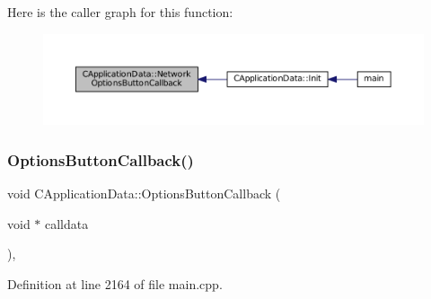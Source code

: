 Here is the caller graph for this function\+:
\nopagebreak
\begin{figure}[H]
\begin{center}
\leavevmode
\includegraphics[width=350pt]{classCApplicationData_ad41dbc2f54ee638aa64a1d0c22b3fba9_icgraph}
\end{center}
\end{figure}
\hypertarget{classCApplicationData_a3647cf78eb59689b901d4204c81555b4}{}\label{classCApplicationData_a3647cf78eb59689b901d4204c81555b4} 
\subsubsection{\texorpdfstring{Options\+Button\+Callback()}{OptionsButtonCallback()}}
{\footnotesize\ttfamily void C\+Application\+Data\+::\+Options\+Button\+Callback (\begin{DoxyParamCaption}\item[{void $\ast$}]{calldata }\end{DoxyParamCaption})\hspace{0.3cm}{\ttfamily [static]}, {\ttfamily [protected]}}



Definition at line 2164 of file main.\+cpp.


